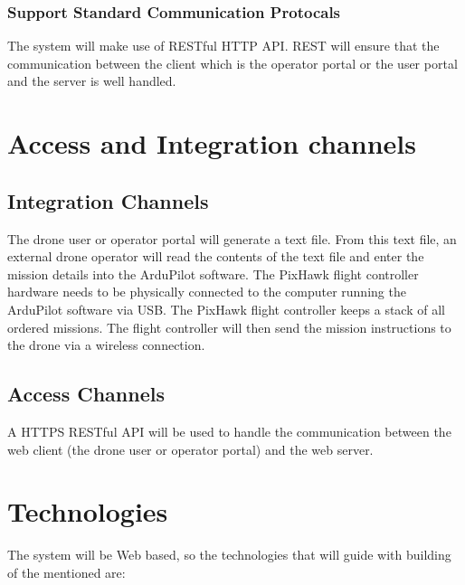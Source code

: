 \documentclass{article}
\begin{document}
	\subsubsection{Support Standard Communication Protocals}
	The system will make use of RESTful HTTP API.
	REST will ensure that the communication between the client which is the operator portal or the user portal and the server is well handled.
	
	\section{Access and Integration channels}%
	\subsection{Integration Channels}
	The drone user or operator portal will generate a text file. From this text file, an external drone operator will read the contents of the text file and enter the mission details into the ArduPilot software. The PixHawk flight controller hardware needs to be physically connected to the computer running the ArduPilot software via USB. The PixHawk flight controller keeps a stack of all ordered missions. The flight controller will then send the mission instructions to the drone via a wireless connection.
	\subsection{Access Channels}
	A HTTPS RESTful API will be used to handle the communication between the web client (the drone user or operator portal) and the web server. 
	\section{Technologies}%
	
	 
	 The system will be Web based, so the technologies that will guide with building of the mentioned are:
	 
\end{document}
